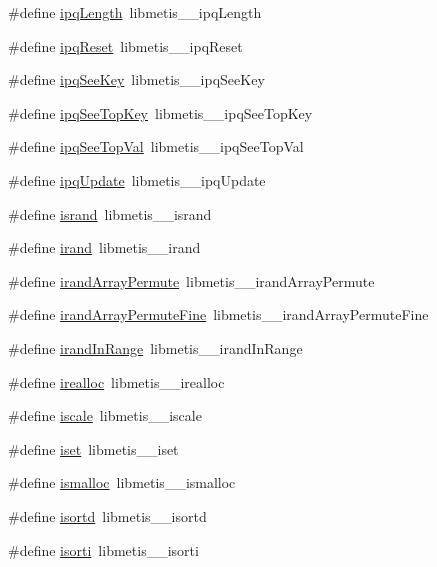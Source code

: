 \begin{DoxyCompactItemize}
\item 
\#define \hyperlink{a00212_a7be5e5ca26cea9943e43a3c5ad9f1be3}{ipq\+Length}~libmetis\+\_\+\+\_\+ipq\+Length
\item 
\#define \hyperlink{a00212_a32aeac90dcad52952f289b294106ce1b}{ipq\+Reset}~libmetis\+\_\+\+\_\+ipq\+Reset
\item 
\#define \hyperlink{a00212_a50512dc8607a5316cbccd2cc19d2ede1}{ipq\+See\+Key}~libmetis\+\_\+\+\_\+ipq\+See\+Key
\item 
\#define \hyperlink{a00212_a0f29bb003bde46b92d0791efe8e44124}{ipq\+See\+Top\+Key}~libmetis\+\_\+\+\_\+ipq\+See\+Top\+Key
\item 
\#define \hyperlink{a00212_ad5202d20c06745c198354860d1d9985e}{ipq\+See\+Top\+Val}~libmetis\+\_\+\+\_\+ipq\+See\+Top\+Val
\item 
\#define \hyperlink{a00212_a7ef689a09af0b37cbec7a3d761cd6155}{ipq\+Update}~libmetis\+\_\+\+\_\+ipq\+Update
\item 
\#define \hyperlink{a00212_a979bb634b3c7b9380d0382da4bb03a23}{isrand}~libmetis\+\_\+\+\_\+isrand
\item 
\#define \hyperlink{a00212_ab77fd104b31692662bdad167cd099ceb}{irand}~libmetis\+\_\+\+\_\+irand
\item 
\#define \hyperlink{a00212_ace85dcaa844accd8fd819af59d578cde}{irand\+Array\+Permute}~libmetis\+\_\+\+\_\+irand\+Array\+Permute
\item 
\#define \hyperlink{a00212_a52e5218e219db4a73d47389bd49d5889}{irand\+Array\+Permute\+Fine}~libmetis\+\_\+\+\_\+irand\+Array\+Permute\+Fine
\item 
\#define \hyperlink{a00212_aac1232319c4c588aae99b753d108daf6}{irand\+In\+Range}~libmetis\+\_\+\+\_\+irand\+In\+Range
\item 
\#define \hyperlink{a00212_a51ca6b79dd1b6e669c81981c61633ce5}{irealloc}~libmetis\+\_\+\+\_\+irealloc
\item 
\#define \hyperlink{a00212_a835c07de65c8e241c618f4f75932676f}{iscale}~libmetis\+\_\+\+\_\+iscale
\item 
\#define \hyperlink{a00212_ab55dca710fb11f3122d75c14f6cada71}{iset}~libmetis\+\_\+\+\_\+iset
\item 
\#define \hyperlink{a00212_aee7c5211af6fbbc06d187b9bc39f2a1f}{ismalloc}~libmetis\+\_\+\+\_\+ismalloc
\item 
\#define \hyperlink{a00212_aae2d23dedb10c344668e39a2e55adcd4}{isortd}~libmetis\+\_\+\+\_\+isortd
\item 
\#define \hyperlink{a00212_a674b4721b466b83d8d07c8a0129d87b8}{isorti}~libmetis\+\_\+\+\_\+isorti

\end{DoxyCompactItemize}
